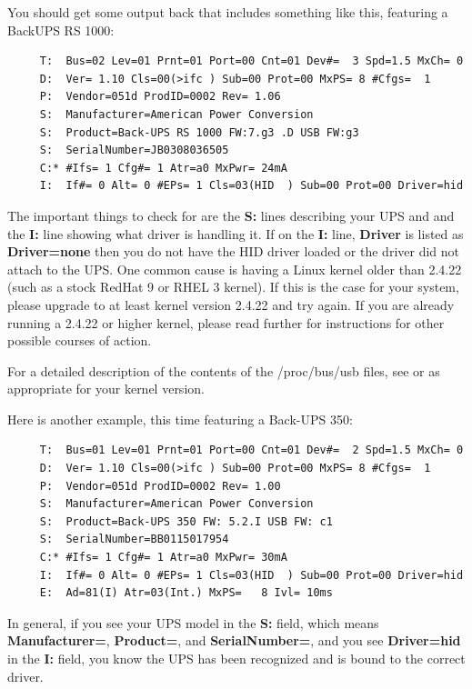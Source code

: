 You should get some output back that includes something like this, featuring
a BackUPS RS 1000: 

\begin{verbatim}
     T:  Bus=02 Lev=01 Prnt=01 Port=00 Cnt=01 Dev#=  3 Spd=1.5 MxCh= 0
     D:  Ver= 1.10 Cls=00(>ifc ) Sub=00 Prot=00 MxPS= 8 #Cfgs=  1
     P:  Vendor=051d ProdID=0002 Rev= 1.06
     S:  Manufacturer=American Power Conversion
     S:  Product=Back-UPS RS 1000 FW:7.g3 .D USB FW:g3
     S:  SerialNumber=JB0308036505
     C:* #Ifs= 1 Cfg#= 1 Atr=a0 MxPwr= 24mA
     I:  If#= 0 Alt= 0 #EPs= 1 Cls=03(HID  ) Sub=00 Prot=00 Driver=hid
\end{verbatim}

The important things to check for are the {\bf S:} lines describing your
UPS and and the {\bf I:} line showing what driver is handling it.
If on the {\bf I:} line, {\bf Driver} is listed as {\bf Driver=none} then
you do not have the HID driver loaded or the driver did not attach to the UPS.
One common cause is having a Linux kernel older than 2.4.22 (such as a stock
RedHat 9 or RHEL 3 kernel). If this is the case for your system, please
upgrade to at least kernel version 2.4.22 and try again. If you are already
running a 2.4.22 or higher kernel, please read further for instructions for
other possible courses of action.  

For a detailed description of the contents of the /proc/bus/usb files, see
 or 
 as
appropriate for your kernel version.

Here is another example, this time featuring a Back-UPS 350:

\begin{verbatim}
     T:  Bus=01 Lev=01 Prnt=01 Port=00 Cnt=01 Dev#=  2 Spd=1.5 MxCh= 0
     D:  Ver= 1.10 Cls=00(>ifc ) Sub=00 Prot=00 MxPS= 8 #Cfgs=  1
     P:  Vendor=051d ProdID=0002 Rev= 1.00
     S:  Manufacturer=American Power Conversion
     S:  Product=Back-UPS 350 FW: 5.2.I USB FW: c1
     S:  SerialNumber=BB0115017954
     C:* #Ifs= 1 Cfg#= 1 Atr=a0 MxPwr= 30mA
     I:  If#= 0 Alt= 0 #EPs= 1 Cls=03(HID  ) Sub=00 Prot=00 Driver=hid
     E:  Ad=81(I) Atr=03(Int.) MxPS=   8 Ivl= 10ms
\end{verbatim}

In general, if you see your UPS model in the {\bf S:} field, which means
{\bf Manufacturer=}, {\bf Product=}, and {\bf SerialNumber=}, and you see
{\bf Driver=hid} in the {\bf I:} field, you know the UPS has been recognized
and is bound to the correct driver.

